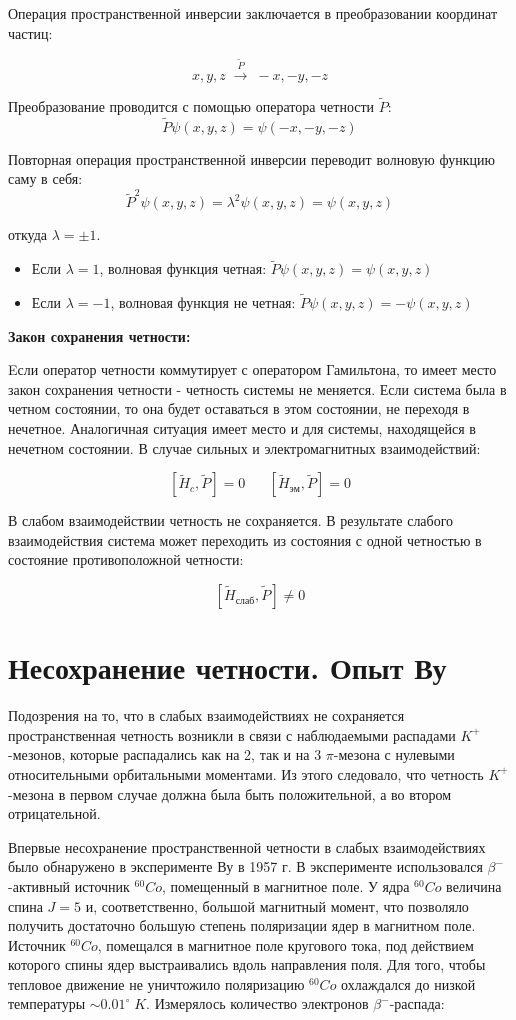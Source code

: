 \documentclass[a4paper]{article}
\begin{document}
Операция пространственной инверсии заключается в преобразовании координат частиц:

$$x,y,z \; \stackrel{\tilde{P}}{\rightarrow} \; -x,-y,-z$$

Преобразование проводится с помощью оператора четности $\tilde{P}$:
$$\tilde{P}\psi(x,y,z) = \psi(-x,-y,-z)$$

Повторная операция пространственной инверсии переводит волновую функцию саму в себя:
$$\tilde{P}^2 \psi(x,y,z) = \lambda^2\psi(x,y,z) = \psi(x,y,z)$$

откуда $\lambda = \pm 1$. 
\begin{itemize}
    \item Если $\lambda = 1$, волновая функция четная: $\tilde{P}\psi(x,y,z) = \psi(x,y,z)$
    \item Если $\lambda = -1$, волновая функция не четная: $\tilde{P}\psi(x,y,z) = -\psi(x,y,z)$
\end{itemize}

\textbf{Закон сохранения четности:}

Eсли оператор четности коммутирует с оператором Гамильтона, то имеет место закон сохранения 
четности - четность системы не меняется. Если система была в четном состоянии, то она будет 
оставаться в этом состоянии, не переходя в нечетное. Аналогичная ситуация имеет место и для 
системы, находящейся в нечетном состоянии. В случае сильных и электромагнитных взаимодействий:

$$[\tilde{H}_c,\tilde{P}] = 0 \;\;\;\;\;\; [\tilde{H}_{\text{эм}},\tilde{P}] = 0$$

В слабом взаимодействии четность не сохраняется. В результате слабого взаимодействия система 
может переходить из состояния с одной четностью в состояние противоположной четности:

$$[\tilde{H}_\text{слаб},\tilde{P}] \neq 0$$

\section{Несохранение четности. Опыт Ву}

Подозрения на то, что в слабых взаимодействиях не сохраняется пространственная четность
возникли в связи с наблюдаемыми распадами $K^+$-мезонов, которые распадались как на 2, так и на 3
$\pi$-мезона с нулевыми относительными орбитальными моментами. Из этого следовало, что четность 
$K^+$-мезона в первом случае должна была быть положительной, а во втором отрицательной.

Впервые несохранение пространственной четности в слабых взаимодействиях было обнаружено в 
эксперименте Ву в 1957 г. В эксперименте использовался $\beta^-$-активный источник $^{60}Co$, 
помещенный в магнитное поле. У ядра $^{60}Co$ величина спина $J = 5$ и, соответственно, большой 
магнитный момент, что позволяло получить достаточно большую степень поляризации ядер в 
магнитном поле. Источник $^{60}Co$, помещался в магнитное поле кругового тока, под действием 
которого спины ядер выстраивались вдоль направления поля. Для того, чтобы тепловое движение не 
уничтожило поляризацию $^{60}Co$ охлаждался до низкой температуры $\sim 0.01^{\circ} \; K$. 
Измерялось количество электронов $\beta^-$-распада:
\end{document}
